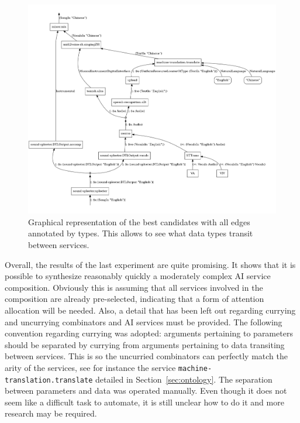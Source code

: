 \documentclass[]{report}
\begin{document}
\begin{figure}[H]
  \centering
  \includegraphics[scale=0.215]{figs/cnd-3-typed.png}
  \caption{Graphical representation of the best candidates with all
    edges annotated by types.  This allows to see what data types
    transit between services.}
  \label{fig:cnd3typed}
\end{figure}
Overall, the results of the last experiment are quite promising.  It
shows that it is possible to synthesize reasonably quickly a
moderately complex AI service composition.  Obviously this is assuming
that all services involved in the composition are already
pre-selected, indicating that a form of attention allocation will be
needed.  Also, a detail that has been left out regarding currying and
uncurrying combinators and AI services must be provided.  The
following convention regarding currying was adopted: arguments
pertaining to parameters should be separated by currying from
arguments pertaining to data transiting between services.  This is so
the uncurried combinators can perfectly match the arity of the
services, see for instance the service
\texttt{machine-translation.translate} detailed in
Section~\ref{sec:ontology}.  The separation between parameters and
data was operated manually.  Even though it does not seem like a
difficult task to automate, it is still unclear how to do it and more
research may be required.
\end{document}
